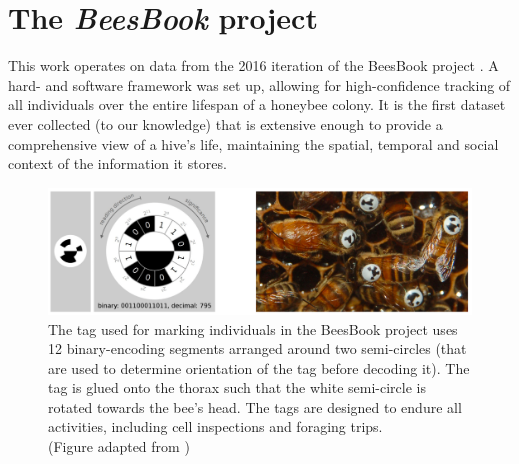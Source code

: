 \section{The \textit{BeesBook} project}
This work operates on data from the 2016 iteration of the BeesBook project
\citep{wario_automatic_2015}. A hard- and software framework was set up, allowing
for high-confidence tracking of all individuals over the entire lifespan of a
honeybee colony. It is the first dataset ever collected (to our knowledge) that
is extensive enough to provide a comprehensive view of a hive’s life,
maintaining the spatial, temporal and social context of the information it
stores. 

\begin{figure}[htbp!] 
\centering    
\includegraphics[width=1.0\textwidth]{Chapters/Chapter1/Figs/tag-design-boenisch.png}
\caption[tag-design-boenisch]{The tag used for marking individuals in the BeesBook project uses 12 binary-encoding segments arranged around two semi-circles (that are used to determine orientation of the tag before decoding it). The tag is glued onto the thorax such that the white semi-circle is rotated towards the bee’s head. The tags are designed to endure all activities, including cell inspections and foraging trips. 
\\(Figure adapted from \cite{boenisch_tracking_2018})}
\label{fig:tag-design-boenisch}
\end{figure}


